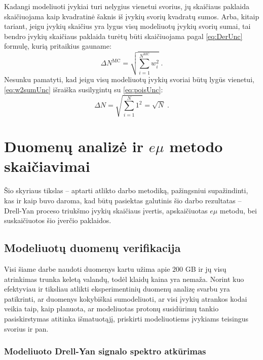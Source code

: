 \documentclass[a4paper, 12pt]{article}
\newlength\q
\begin{document}
Kadangi modeliuoti įvykiai turi nelygius vienetui svorius, jų skaičiaus paklaida skaičiuojama kaip kvadratinė šaknis iš įvykių svorių kvadratų sumos. Arba, kitaip tariant, jeigu įvykių skaičius yra lygus visų modeliuotų įvykių svorių sumai, tai bendro įvykių skaičiaus paklaida turėtų būti skaičiuojama pagal \eqref{eq:DerUnc} formulę, kurią pritaikius gauname:
\begin{equation}
\Delta N^{\mathrm{MC}} = \sqrt{\sum_{i=1}^{N^{\mathrm{MC}}}w_{i}^{2}} \; .
\label{eq:w2sumUnc}
\end{equation}
Nesunku pamatyti, kad jeigu visų modeliuotų įvykių svoriai būtų lygūs vienetui, \eqref{eq:w2sumUnc} išraiška susilygintų su \eqref{eq:poisUnc}:
\begin{equation}
\Delta N = \sqrt{\sum_{i=1}^{N}1^{2}}=\sqrt{N} \; .
\label{eq:Useless}
\end{equation}


\clearpage
\section{Duomenų analizė ir $e\mu$ metodo skaičiavimai}

Šio skyriaus tikslas -- aptarti atlikto darbo metodiką, pažingsniui supažindinti, kas ir kaip buvo daroma, kad būtų pasiektas galutinis šio darbo rezultatas -- Drell-Yan proceso triukšmo įvykių skaičiaus įvertis, apskaičiuotas $e\mu$ metodu, bei suskaičiuotos šio įverčio paklaidos.

\subsection{Modeliuotų duomenų verifikacija}

Visi šiame darbe naudoti duomenys kartu užima apie $200$ GB ir jų visų atrinkimas trunka keletą valandų, todėl klaidų kaina yra nemaža. Norint kuo efektyviau ir tiksliau atlikti eksperimentinių duomenų analizę svarbu yra patikrinti, ar duomenys kokybiškai sumodeliuoti, ar visi įvykių atrankos kodai veikia taip, kaip planuota, ar modeliuotas protonų susidūrimų tankio pasiskirstymas atitinka išmatuotąjį, priskirti modeliuotiems įvykiams teisingus svorius ir pan.

\subsubsection{Modeliuoto Drell-Yan signalo spektro atkūrimas}
\end{document}
